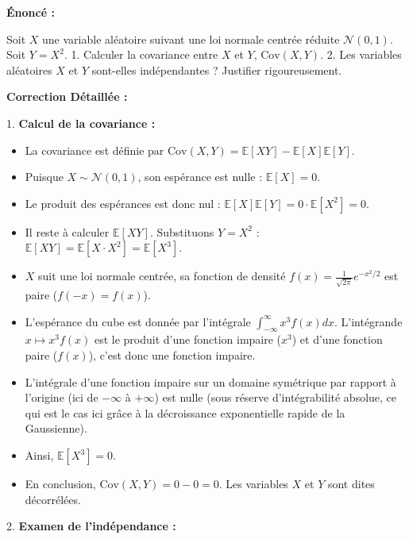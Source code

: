 \documentclass[11pt,a4paper]{article}
\begin{document}
\textbf{Énoncé :}

Soit $X$ une variable aléatoire suivant une loi normale centrée réduite $\mathcal{N}(0,1)$.
Soit $Y = X^2$.
1. Calculer la covariance entre $X$ et $Y$, $\text{Cov}(X,Y)$.
2. Les variables aléatoires $X$ et $Y$ sont-elles indépendantes ? Justifier rigoureusement.

\textbf{Correction Détaillée :}

1. \textbf{Calcul de la covariance :}
\begin{itemize}
\item La covariance est définie par $\text{Cov}(X,Y) = \mathbb{E}[XY] - \mathbb{E}[X]\mathbb{E}[Y]$.
\item Puisque $X \sim \mathcal{N}(0,1)$, son espérance est nulle : $\mathbb{E}[X] = 0$.
\item Le produit des espérances est donc nul : $\mathbb{E}[X]\mathbb{E}[Y] = 0 \cdot \mathbb{E}[X^2] = 0$.
\item Il reste à calculer $\mathbb{E}[XY]$. Substituons $Y = X^2$ : $\mathbb{E}[XY] = \mathbb{E}[X \cdot X^2] = \mathbb{E}[X^3]$.
\item $X$ suit une loi normale centrée, sa fonction de densité $f(x) = \frac{1}{\sqrt{2\pi}} e^{-x^2/2}$ est paire ($f(-x) = f(x)$).
\item L'espérance du cube est donnée par l'intégrale $\int_{-\infty}^{\infty} x^3 f(x) dx$. L'intégrande $x \mapsto x^3 f(x)$ est le produit d'une fonction impaire ($x^3$) et d'une fonction paire ($f(x)$), c'est donc une fonction impaire.
\item L'intégrale d'une fonction impaire sur un domaine symétrique par rapport à l'origine (ici de $-\infty$ à $+\infty$) est nulle (sous réserve d'intégrabilité absolue, ce qui est le cas ici grâce à la décroissance exponentielle rapide de la Gaussienne).
\item Ainsi, $\mathbb{E}[X^3] = 0$.
\item En conclusion, $\text{Cov}(X,Y) = 0 - 0 = 0$. Les variables $X$ et $Y$ sont dites décorrélées.
\end{itemize}2. \textbf{Examen de l'indépendance :}
\end{document}
